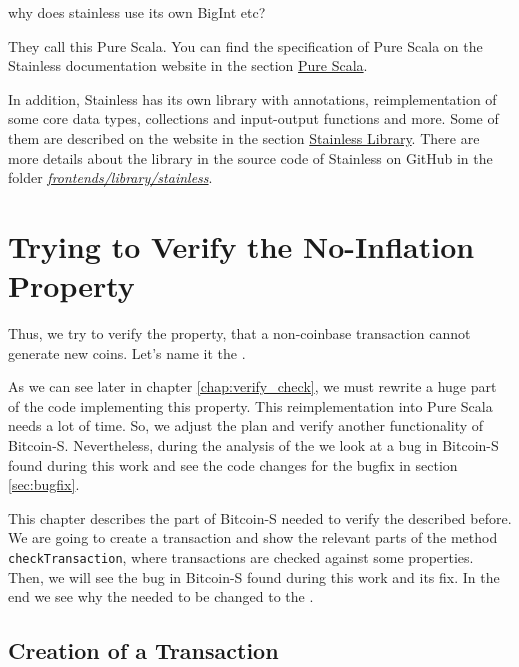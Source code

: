 \documentclass[runningheads]{llncs}
\newcommand{\todo}[1]{{\par \color{red}#1}}
\begin{document}
\todo{why does stainless use its own BigInt etc?}

They call this Pure Scala.  You can find the specification of Pure
Scala on the Stainless documentation website
\cite{Stainless:documentation} in the section
\href{https://epfl-lara.github.io/stainless/purescala.html}{Pure
  Scala}.

In addition, Stainless has its own library with annotations,
reimplementation of some core data types, collections and input-output
functions and more.  Some of them are described on the website in the
section
\href{https://epfl-lara.github.io/stainless/library.html}{Stainless
  Library}.  There are more details about the library in the source
code of Stainless on GitHub \cite{Stainless:github} in the folder
\href{https://github.com/epfl-lara/stainless/tree/master/frontends/library/stainless}{\textit{frontends/library/stainless}}.





\section{Trying to Verify the No-Inflation Property}

Thus, we try to verify the property, that a non-coinbase transaction
cannot generate new coins.  Let's name it the .

As we can see later in chapter \ref{chap:verify_check}, we must
rewrite a huge part of the code implementing this property.  This
reimplementation into Pure Scala needs a lot of time.  So, we adjust
the plan and verify another functionality of Bitcoin-S.  Nevertheless,
during the analysis of the  we look at a bug in
Bitcoin-S found during this work and see the code changes for the
bugfix in section \ref{sec:bugfix}.


This chapter describes the part of Bitcoin-S needed to verify the
 described before.  We are going to create a
transaction and show the relevant parts of the method
\texttt{checkTransaction}, where transactions are checked against some
properties.  Then, we will see the bug in Bitcoin-S found during this
work and its fix.  In the end we see why the 
needed to be changed to the .


\subsection{Creation of a Transaction}
\end{document}
